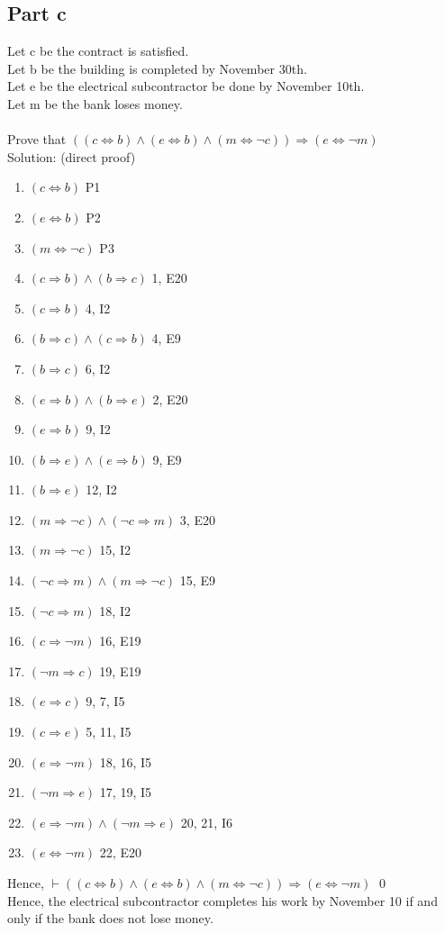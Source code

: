 \documentclass{article}
\begin{document}
		\subsection{Part c}
			Let c be the contract is satisfied. \\
			Let b be the building is completed by November 30th. \\
			Let e be the electrical subcontractor be done by November 10th. \\
			Let m be the bank loses money. \\
			\\
			Prove that $((c \Leftrightarrow b) \land (e \Leftrightarrow b) \land (m \Leftrightarrow \lnot c)) \Rightarrow (e \Leftrightarrow \lnot m)$ \\
			Solution: (direct proof) \\
			\begin{enumerate}
				\item $(c \Leftrightarrow b)$ \hfill P1
				\item $(e \Leftrightarrow b)$ \hfill P2
				\item $(m \Leftrightarrow \lnot c)$ \hfill P3
				\item $(c \Rightarrow b) \land (b \Rightarrow c)$ \hfill 1, E20
				\item $(c \Rightarrow b)$ \hfill 4, I2
				\item $(b \Rightarrow c) \land (c \Rightarrow b)$ \hfill 4, E9
				\item $(b \Rightarrow c)$ \hfill 6, I2
				\item $(e \Rightarrow b) \land (b \Rightarrow e)$ \hfill 2, E20
				\item $(e \Rightarrow b)$ \hfill 9, I2
				\item $(b \Rightarrow e) \land (e \Rightarrow b)$ \hfill 9, E9
				\item $(b \Rightarrow e)$ \hfill 12, I2
				\item $(m \Rightarrow \lnot c) \land (\lnot c \Rightarrow m)$ \hfill 3, E20
				\item $(m \Rightarrow \lnot c)$ \hfill 15, I2
				\item $(\lnot c \Rightarrow m) \land (m \Rightarrow \lnot c)$ \hfill 15, E9
				\item $(\lnot c \Rightarrow m)$ \hfill 18, I2
				\item $(c \Rightarrow \lnot m)$ \hfill 16, E19
				\item $(\lnot m \Rightarrow c)$ \hfill 19, E19
				\item $(e \Rightarrow c)$ \hfill 9, 7, I5
				\item $(c \Rightarrow e)$ \hfill 5, 11, I5
				\item $(e \Rightarrow \lnot m)$ \hfill 18, 16, I5
				\item $(\lnot m \Rightarrow e)$ \hfill 17, 19, I5
				\item $(e \Rightarrow \lnot m) \land (\lnot m \Rightarrow e)$ \hfill 20, 21, I6
				\item $(e \Leftrightarrow \lnot m)$ \hfill 22, E20
			\end{enumerate}
			Hence, $\vdash$$((c \Leftrightarrow b) \land (e \Leftrightarrow b) \land (m \Leftrightarrow \lnot c)) \Rightarrow (e \Leftrightarrow \lnot m)$ \hfill \qed \\
			Hence, the electrical subcontractor completes his work by November 10 if and only if the bank does not lose money.
\end{document}
